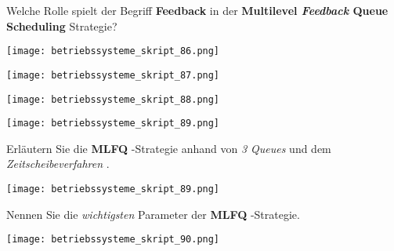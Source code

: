 \documentclass{article}
\begin{document}
\begin{tcolorbox}[colback=white!10!white,colframe=lightgray!75!black,
  savelowerto=\jobname_ex.tex,breakable,enhanced,lines before break=40]

\begin{center}
Welche Rolle spielt der Begriff 
\textbf{Feedback
} in der 
\textbf{Multilevel 
\textit{Feedback
} Queue Scheduling
} Strategie?

\end{center}

\tcblower

\justifying
\begin{center}
\texttt{[image: betriebssysteme\_skript\_86.png]}
\end{center}
\begin{center}
\texttt{[image: betriebssysteme\_skript\_87.png]}
\end{center}
\begin{center}
\texttt{[image: betriebssysteme\_skript\_88.png]}
\end{center}
\begin{center}
\texttt{[image: betriebssysteme\_skript\_89.png]}
\end{center}

\end{tcolorbox}
\begin{tcolorbox}[colback=white!10!white,colframe=lightgray!75!black,
  savelowerto=\jobname_ex.tex,breakable,enhanced,lines before break=40]

\begin{center}
Erläutern Sie die 
\textbf{MLFQ
}-Strategie anhand von 
\textit{3 Queues
} und dem 
\textit{Zeitscheibeverfahren
}.

\end{center}

\tcblower

\justifying
\begin{center}
\texttt{[image: betriebssysteme\_skript\_89.png]}
\end{center}

\end{tcolorbox}
\begin{tcolorbox}[colback=white!10!white,colframe=lightgray!75!black,
  savelowerto=\jobname_ex.tex,breakable,enhanced,lines before break=40]

\begin{center}
Nennen Sie die 
\textit{wichtigsten
} Parameter der 
\textbf{MLFQ
}-Strategie.

\end{center}

\tcblower

\justifying
\begin{center}
\texttt{[image: betriebssysteme\_skript\_90.png]}
\end{center}

\end{tcolorbox}
\end{document}
